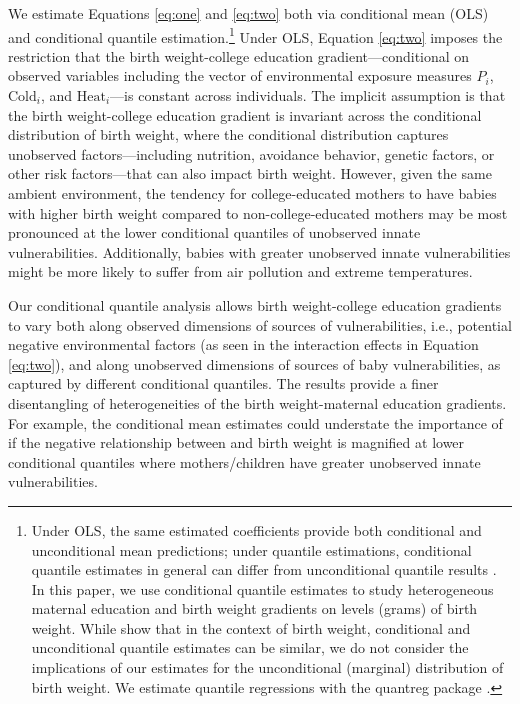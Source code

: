 We estimate Equations \eqref{eq:one} and \eqref{eq:two} both via conditional mean (OLS) and conditional quantile estimation.\footnote{Under OLS, the same
  estimated coefficients provide both conditional and unconditional mean
  predictions; under quantile estimations, conditional quantile
  estimates in general can differ from unconditional quantile results
  \autocite{firpo_unconditional_2009}. In this paper, we use conditional
  quantile estimates to study heterogeneous maternal education and
  birth weight gradients on levels (grams) of birth weight. While \textcite{firpo_unconditional_2009} show that in the
  context of birth weight, conditional and unconditional quantile
  estimates can be similar, we do not consider the implications of our
  estimates for the unconditional (marginal) distribution of
  birth weight. We estimate quantile regressions with the quantreg package \autocite{koenker_quantreg_2020}.} Under OLS, Equation \eqref{eq:two} imposes the restriction that the
birth weight-college education gradient---conditional on observed variables 
including the vector of environmental exposure measures \(P_{i}\),
\(\text{Cold}_{i}\), and \(\text{Heat}_{i}\)---is constant across
individuals. The implicit assumption is that the birth weight-college education gradient is invariant across the conditional distribution of birth weight, where the conditional distribution captures unobserved
factors---including nutrition, avoidance behavior, genetic factors, or
other risk factors---that can also impact birth weight. However, given the same ambient environment, the tendency for
college-educated mothers to have babies with higher birth weight compared
to non-college-educated mothers may be most pronounced at the lower
conditional quantiles of unobserved innate vulnerabilities.
Additionally, babies with greater unobserved innate
vulnerabilities might be more likely to suffer from air pollution and
extreme temperatures.

Our conditional quantile analysis allows  birth
weight-college education gradients to vary both along observed dimensions of sources of
vulnerabilities, i.e., potential negative environmental factors (as seen in the interaction effects in Equation \eqref{eq:two}), and along
unobserved dimensions of sources of baby vulnerabilities, as captured by
different conditional quantiles. The results provide a finer
disentangling of heterogeneities of the birth
weight-maternal education gradients. For example, the conditional mean estimates could
understate the importance of \PARPMTEN if the negative relationship between
\PARPMTEN and birth weight is magnified at lower conditional quantiles where
mothers/children have greater unobserved innate vulnerabilities.

